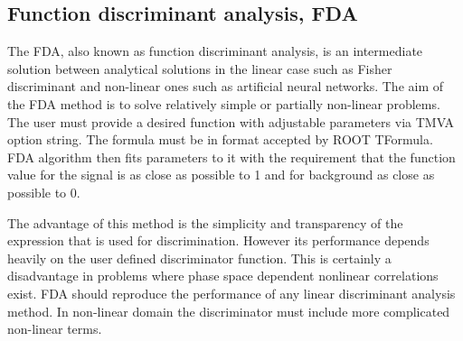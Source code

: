 \subsection{Function discriminant analysis, FDA}

The FDA, also known as function discriminant analysis, is an
intermediate solution between analytical solutions in the linear case
such as Fisher discriminant and non-linear ones such as artificial
neural networks. The aim of the FDA method is to solve relatively
simple or partially non-linear problems. The user must provide a
desired function with adjustable parameters via TMVA option
string. The formula must be in format accepted by ROOT TFormula. FDA
algorithm then fits parameters to it with the requirement that the
function value for the signal is as close as possible to 1 and for
background as close as possible to 0.

The advantage of this method is the simplicity and transparency of the
expression that is used for discrimination. However its performance
depends heavily on the user defined discriminator function. This is
certainly a disadvantage in problems where phase space dependent
nonlinear correlations exist. FDA should reproduce the performance of
any linear discriminant analysis method. In non-linear domain the
discriminator must include more complicated non-linear terms.
 
